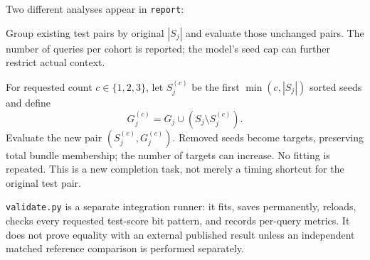 \documentclass[11pt,a4paper]{article}
\newcommand{\code}[1]{\nolinkurl{#1}}
\numberwithin{equation}{section}
\begin{document}
Two different analyses appear in \code{report}:
\begin{description}[style=nextline]
\item[Observed seed-count cohorts]
Group existing test pairs by original $|S_j|$ and evaluate those unchanged pairs. The number
of queries per cohort is reported; the model's seed cap can further restrict actual context.
\item[Controlled seed stress]
For requested count $c\in\{1,2,3\}$, let $S_j^{(c)}$ be the first $\min(c,|S_j|)$ sorted
seeds and define
\begin{equation}
 G_j^{(c)}=G_j\cup(S_j\setminus S_j^{(c)}).
\end{equation}
Evaluate the new pair $(S_j^{(c)},G_j^{(c)})$. Removed seeds become targets, preserving total
bundle membership; the number of targets can increase. No fitting is repeated. This is a
new completion task, not merely a timing shortcut for the original test pair.
\end{description}
\code{validate.py} is a separate integration runner: it fits, saves permanently, reloads,
checks every requested test-score bit pattern, and records per-query metrics. It does
not prove equality with an external published result unless an independent matched
reference comparison is performed separately.
\end{document}
